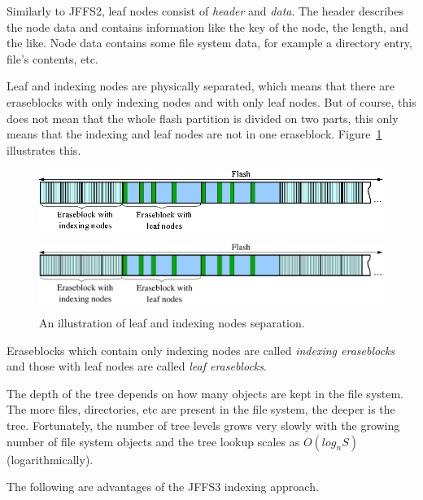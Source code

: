 Similarly to JFFS2, leaf nodes consist of \emph{header} and \emph{data}. The
header describes the node data and contains information like the key of the
node, the length, and the like. Node data contains some file system data, for
example a directory entry, file's contents, etc. 

Leaf and indexing nodes are physically separated, which means that there are
eraseblocks with only indexing nodes and with only leaf nodes. But of course,
this does not mean that the whole flash partition is divided on two parts, this
only means that the indexing and leaf nodes are not in one eraseblock.
Figure~\ref{ref_FigureFlash_01} illustrates this.

%
%
\begin{figure}[h]
\begin{center}
\begin{htmlonly}
\includegraphics{pics/flash-01.png}
\end{htmlonly}
\includegraphics[width=159mm,height=25mm]{pics/flash-01.pdf}
\end{center}
\caption{An illustration of leaf and indexing nodes separation.}
\label{ref_FigureFlash_01}
\end{figure}

Eraseblocks which contain only indexing nodes are called \emph{indexing
eraseblocks} and those with leaf nodes are called \emph{leaf eraseblocks}.

The depth of the tree depends on how many objects are kept in the file system.
The more files, directories, etc are present in the file system, the deeper is
the tree. Fortunately, the number of tree levels grows very slowly with the
growing number of file system objects and the tree lookup scales as
$O(log_n{S})$ (logarithmically).

The following are advantages of the JFFS3 indexing approach.

